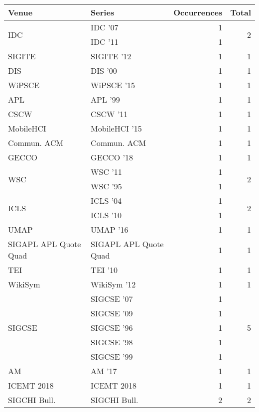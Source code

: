\begin{table*}[t]
\begin{tabular}{llrr}
Venue & Series & Occurrences & Total\\\hline
\multirow{2}{*}{IDC } & IDC '07 & 1 & \multirow{2}{*}{2}\\
& IDC '11 & 1 &\\
\multirow{1}{*}{SIGITE } & SIGITE '12 & 1 & \multirow{1}{*}{1}\\
\multirow{1}{*}{DIS } & DIS '00 & 1 & \multirow{1}{*}{1}\\
\multirow{1}{*}{WiPSCE } & WiPSCE '15 & 1 & \multirow{1}{*}{1}\\
\multirow{1}{*}{APL } & APL '99 & 1 & \multirow{1}{*}{1}\\
\multirow{1}{*}{CSCW } & CSCW '11 & 1 & \multirow{1}{*}{1}\\
\multirow{1}{*}{MobileHCI } & MobileHCI '15 & 1 & \multirow{1}{*}{1}\\
\multirow{1}{*}{Commun. ACM} & Commun. ACM & 1 & \multirow{1}{*}{1}\\
\multirow{1}{*}{GECCO } & GECCO '18 & 1 & \multirow{1}{*}{1}\\
\multirow{2}{*}{WSC } & WSC '11 & 1 & \multirow{2}{*}{2}\\
& WSC '95 & 1 &\\
\multirow{2}{*}{ICLS } & ICLS '04 & 1 & \multirow{2}{*}{2}\\
& ICLS '10 & 1 &\\
\multirow{1}{*}{UMAP } & UMAP '16 & 1 & \multirow{1}{*}{1}\\
\multirow{1}{*}{SIGAPL APL Quote Quad} & SIGAPL APL Quote Quad & 1 & \multirow{1}{*}{1}\\
\multirow{1}{*}{TEI } & TEI '10 & 1 & \multirow{1}{*}{1}\\
\multirow{1}{*}{WikiSym } & WikiSym '12 & 1 & \multirow{1}{*}{1}\\
\multirow{5}{*}{SIGCSE } & SIGCSE '07 & 1 & \multirow{5}{*}{5}\\
& SIGCSE '09 & 1 &\\
& SIGCSE '96 & 1 &\\
& SIGCSE '98 & 1 &\\
& SIGCSE '99 & 1 &\\
\multirow{1}{*}{AM } & AM '17 & 1 & \multirow{1}{*}{1}\\
\multirow{1}{*}{ICEMT 2018} & ICEMT 2018 & 1 & \multirow{1}{*}{1}\\
\multirow{1}{*}{SIGCHI Bull.} & SIGCHI Bull. & 2 & \multirow{1}{*}{2}\\

\end{tabular}
\end{table*}
